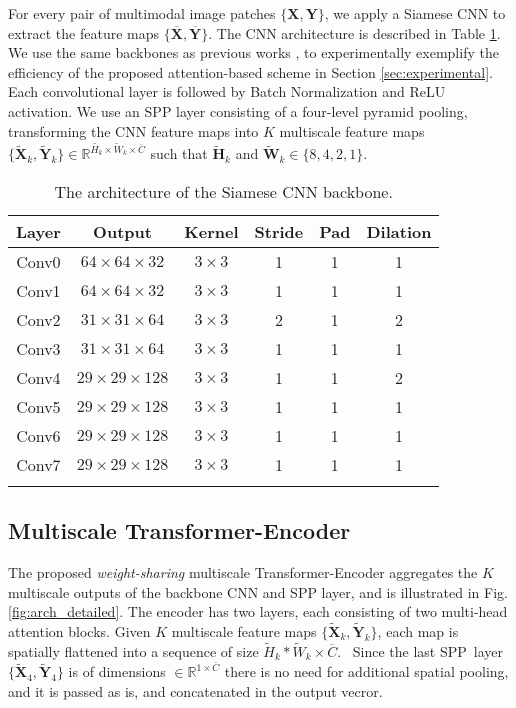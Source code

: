 \documentclass[10pt,journal]{IEEEtran}\usepackage{amsfonts}
\begin{document}
For every pair of multimodal image patches $\{\mathbf{X},\mathbf{Y}\}$, we
apply a Siamese CNN to extract the feature maps $\{\overline{\mathbf{X}},\overline{\mathbf{Y}}\}$. The CNN architecture is described in Table \ref {tab:cnn}. We use the same backbones as previous works \cite {BetterAndFaster, Zagoruyko}, to experimentally exemplify the efficiency of
the proposed attention-based scheme in Section \ref{sec:experimental}. Each
convolutional layer is followed by Batch Normalization and ReLU activation.
We use an SPP layer \cite{SPP} consisting of a four-level pyramid pooling,
transforming the CNN feature maps into $K$ multiscale feature maps $\{\mathbf{\widetilde{X}}_{k},\mathbf{\widetilde{Y}}_{k}\}\in \mathbb{R}^{\widetilde{H_{k}}\times \widetilde{W}_{k}\times \overline{C}}$ such that $\mathbf{\widetilde{H}}_{k}$ and $\mathbf{\widetilde{W}}_{k}\in \{8,4,2,1\}$.
\begin{table}[tbh]
\setlength\tabcolsep{4pt} \centering
\begin{tabular}{cccccc}
\toprule Layer & Output & Kernel & Stride & Pad & Dilation \\
\midrule Conv0 & $64\times 64\times 32$ & $3\times 3$ & 1 & 1 & 1 \\
Conv1 & $64\times 64\times 32$ & $3\times 3$ & 1 & 1 & 1 \\
Conv2 & $31\times 31\times 64$ & $3\times 3$ & 2 & 1 & 2 \\
Conv3 & $31\times 31\times 64$ & $3\times 3$ & 1 & 1 & 1 \\
Conv4 & $29\times 29\times 128$ & $3\times 3$ & 1 & 1 & 2 \\
Conv5 & $29\times 29\times 128$ & $3\times 3$ & 1 & 1 & 1 \\
Conv6 & $29\times 29\times 128$ & $3\times 3$ & 1 & 1 & 1 \\
Conv7 & $29\times 29\times 128$ & $3\times 3$ & 1 & 1 & 1 \\
\bottomrule &  &  &  &  &
\end{tabular}\caption{The architecture of the Siamese CNN backbone.}
\label{tab:cnn}
\end{table}

\subsection{Multiscale Transformer-Encoder}

\label{subsec:multiscale_transformer}

The proposed \emph{weight-sharing} multiscale Transformer-Encoder aggregates
the $K$ multiscale outputs of the backbone CNN and SPP layer, and is
illustrated in Fig. \ref{fig:arch_detailed}. The encoder has two layers,
each consisting of two multi-head attention blocks. Given $K$ multiscale
feature maps $\{\mathbf{\widetilde{X}}_{k},\mathbf{\widetilde{Y}}_{k}\}$,
each map is spatially flattened into a sequence of size $\widetilde{H}_{k}\ast \widetilde{W}_{k}\times \overline{C}$. \ Since the last SPP\ layer $\{\mathbf{\widetilde{X}}_{4},\mathbf{\widetilde{Y}}_{4}\}$ is of dimensions $\in \mathbb{R}^{1\times \overline{C}}$ there is no need for additional
spatial pooling, and it is passed as is, and concatenated in the output
vecror.
\end{document}
